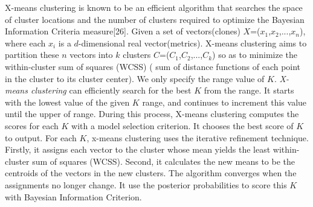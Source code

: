 X-means clustering is known to be an efficient algorithm that searches the space of cluster locations and the number of clusters required to optimize the Bayesian Information Criteria measure[26]. %
Given a set of vectors(clones) $X$={($x_1$,$x_2$,$...$,$x_n$)}, where each $x_i$ is a $d$-dimensional real vector(metrics). X-means clustering aims to partition these $n$ vectors into $k$ clusters $C$={($C_1$,$C_2$,$...$,$C_k$)} so as to minimize the within-cluster sum of squares (WCSS) (%
sum of distance functions of each point in the cluster to its cluster center). We only specify the range value of $K$. {\em X-means clustering} can efficiently search for the best $K$ from the range. It starts with the lowest value of the given $K$ range, and continues to increment this value until the upper of range. During this process, X-means clustering computes the scores for each $K$ with a model selection criterion. It chooses the best score of $K$ to output. For each $K$, x-means clustering uses the iterative refinement technique. Firstly, it assigns each vector to the cluster whose mean yields the least within-cluster sum of squares (WCSS). Second, it calculates the new means to be the centroids of the vectors in the new clusters. The algorithm converges when the assignments no longer change.
It use the posterior probabilities to score this $K$ with Bayesian Information Criterion.

